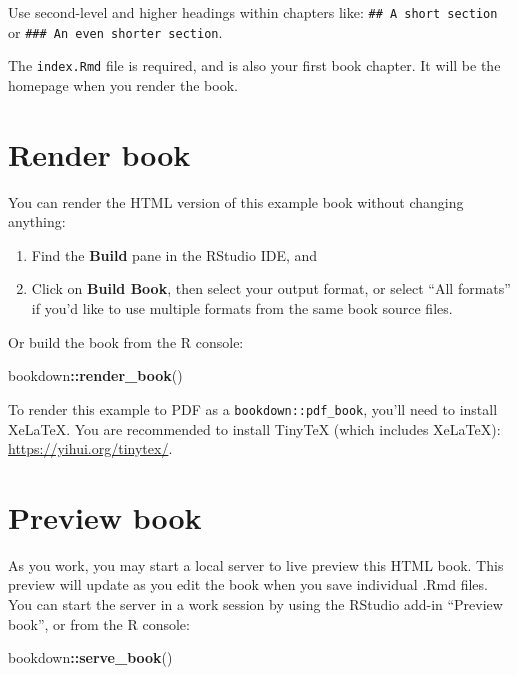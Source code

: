 \documentclass[
]{book}
\newenvironment{Shaded}{\begin{snugshade}}{\end{snugshade}}
\newcommand{\FunctionTok}[1]{\textcolor[rgb]{0.13,0.29,0.53}{\textbf{#1}}}
\newcommand{\NormalTok}[1]{#1}
\newcommand{\SpecialCharTok}[1]{\textcolor[rgb]{0.81,0.36,0.00}{\textbf{#1}}}
\begin{document}
Use second-level and higher headings within chapters like: \texttt{\#\#\ A\ short\ section} or \texttt{\#\#\#\ An\ even\ shorter\ section}.

The \texttt{index.Rmd} file is required, and is also your first book chapter. It will be the homepage when you render the book.

\section*{Render book}\label{render-book}

You can render the HTML version of this example book without changing anything:

\begin{enumerate}
\def\labelenumi{\arabic{enumi}.}
\item
  Find the \textbf{Build} pane in the RStudio IDE, and
\item
  Click on \textbf{Build Book}, then select your output format, or select ``All formats'' if you'd like to use multiple formats from the same book source files.
\end{enumerate}

Or build the book from the R console:

\begin{Shaded}
\begin{Highlighting}[]
\NormalTok{bookdown}\SpecialCharTok{::}\FunctionTok{render\_book}\NormalTok{()}
\end{Highlighting}
\end{Shaded}

To render this example to PDF as a \texttt{bookdown::pdf\_book}, you'll need to install XeLaTeX. You are recommended to install TinyTeX (which includes XeLaTeX): \url{https://yihui.org/tinytex/}.

\section*{Preview book}\label{preview-book}

As you work, you may start a local server to live preview this HTML book. This preview will update as you edit the book when you save individual .Rmd files. You can start the server in a work session by using the RStudio add-in ``Preview book'', or from the R console:

\begin{Shaded}
\begin{Highlighting}[]
\NormalTok{bookdown}\SpecialCharTok{::}\FunctionTok{serve\_book}\NormalTok{()}
\end{Highlighting}
\end{Shaded}
\end{document}
